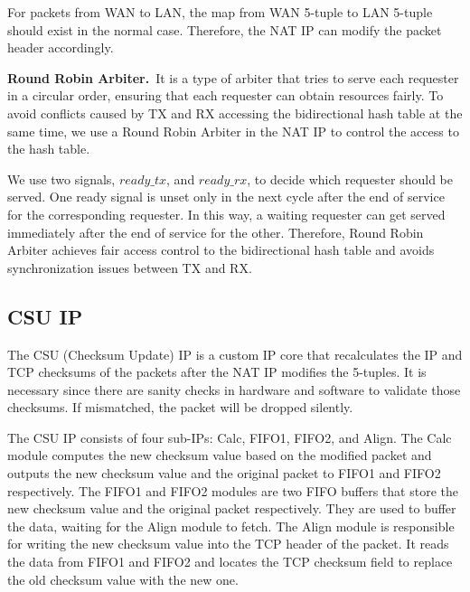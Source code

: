     For packets from WAN to LAN, the map from WAN 5-tuple to LAN 5-tuple should exist in the normal case. Therefore, the NAT IP can modify the packet header accordingly.

    \textbf{Round Robin Arbiter.}\ It is a type of arbiter that tries to serve each requester in a circular order, ensuring that each requester can obtain resources fairly. To avoid conflicts caused by TX and RX accessing the bidirectional hash table at the same time, we use a Round Robin Arbiter in the NAT IP to control the access to the hash table. 

    We use two signals, $ready\_tx$, and $ready\_rx$, to decide which requester should be served. One ready signal is unset only in the next cycle after the end of service for the corresponding requester. In this way, a waiting requester can get served immediately after the end of service for the other. Therefore, Round Robin Arbiter achieves fair access control to the bidirectional hash table and avoids synchronization issues between TX and RX.
    
\subsection{CSU IP}
    The CSU (Checksum Update) IP is a custom IP core that recalculates the IP and TCP checksums of the packets after the NAT IP modifies the 5-tuples. It is necessary since there are sanity checks in hardware and software to validate those checksums. If mismatched, the packet will be dropped silently. 
    
    The CSU IP consists of four sub-IPs: Calc, FIFO1, FIFO2, and Align. 
    The Calc module computes the new checksum value based on the modified packet and outputs the new checksum value and the original packet to FIFO1 and FIFO2 respectively.
    The FIFO1 and FIFO2 modules are two FIFO buffers that store the new checksum value and the original packet respectively. They are used to buffer the data, waiting for the Align module to fetch. 
    The Align module is responsible for writing the new checksum value into the TCP header of the packet. It reads the data from FIFO1 and FIFO2 and locates the TCP checksum field to replace the old checksum value with the new one.